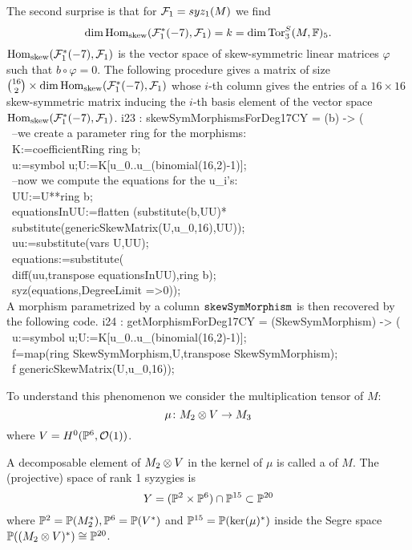 \medskip
The second surprise is that for ${\mathcal F}_1 = syz_1(M)$ we find
$$\dim \operatorname{Hom}_{\rm skew}({\mathcal F}_1^*(-7),{\mathcal F}_1) =k= \dim {\rm{Tor}}_3^S(M,{\mathbb F})_5.$$
$\operatorname{Hom}_{\rm skew}({\mathcal F}_1^*(-7),{\mathcal F}_1)$ is the vector space of skew-symmetric
linear matrices $\varphi$ such that $b \circ \varphi = 0$.
The following procedure gives a matrix of size
$\binom{16}2\times\dim \operatorname{Hom}_{\rm skew}({\mathcal F}_1^*(-7),{\mathcal F}_1)$
whose $i$-th column gives the entries of a $16\times16$ skew-symmetric matrix 
inducing the $i$-th basis element of the vector space $\operatorname{Hom}_{\rm skew}({\mathcal F}_1^*(-7),{\mathcal F}_1)$.
\beginOutput
i23 : skewSymMorphismsForDeg17CY = (b) -> (\\
\           --we create a parameter ring for the morphisms: \\
\           K:=coefficientRing ring b;\\
\           u:=symbol u;U:=K[u_0..u_(binomial(16,2)-1)];\\
\           --now we compute the equations for the u_i's:\\
\           UU:=U**ring b;\\
\           equationsInUU:=flatten (substitute(b,UU)*\\
\                substitute(genericSkewMatrix(U,u_0,16),UU));\\
\           uu:=substitute(vars U,UU);\\
\           equations:=substitute(\\
\                diff(uu,transpose equationsInUU),ring b);\\
\           syz(equations,DegreeLimit =>0));\\
\endOutput
A morphism parametrized by a column $\tt skewSymMorphism$ is then recovered
by the following code.
\beginOutput
i24 : getMorphismForDeg17CY = (SkewSymMorphism) -> (\\
\           u:=symbol u;U:=K[u_0..u_(binomial(16,2)-1)];\\
\           f=map(ring SkewSymMorphism,U,transpose SkewSymMorphism);\\
\           f genericSkewMatrix(U,u_0,16));\\
\endOutput


To understand this phenomenon we consider the multiplication tensor of $M$:
$$\mu \colon M_2 \otimes V \to M_3$$
where $V=H^0({\mathbb P}^6,{\mathcal O}(1))$. 

\begin{definition} A decomposable element of $M_2 \otimes V$ in the kernel of 
$\mu$ is called a  of $M$.
The (projective) space of rank 1 syzygies is
$$Y=({\mathbb P}^2 \times {\mathbb P}^6) \cap {\mathbb P}^{15} \subset {\mathbb P}^{20}$$
where ${\mathbb P}^2={\mathbb P}(M_2^*),{\mathbb P}^6={\mathbb P}(V^*)$ and ${\mathbb P}^{15}={\mathbb P}(\ker(\mu)^*)$
inside the Segre space ${\mathbb P}((M_2 \otimes V)^*)\cong {\mathbb P}^{20}$. 
\end{definition}

